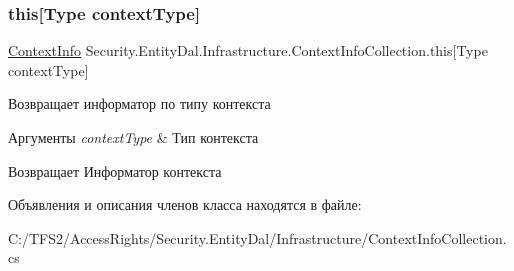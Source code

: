\subsubsection{\texorpdfstring{this[Type context\+Type]}{this[Type contextType]}}
{\footnotesize\ttfamily \hyperlink{class_security_1_1_entity_dal_1_1_infrastructure_1_1_context_info}{Context\+Info} Security.\+Entity\+Dal.\+Infrastructure.\+Context\+Info\+Collection.\+this\mbox{[}Type context\+Type\mbox{]}\hspace{0.3cm}{\ttfamily [get]}}



Возвращает информатор по типу контекста 


\begin{DoxyParams}{Аргументы}
{\em context\+Type} & Тип контекста\\
\hline
\end{DoxyParams}
\begin{DoxyReturn}{Возвращает}
Информатор контекста
\end{DoxyReturn}


Объявления и описания членов класса находятся в файле\+:\begin{DoxyCompactItemize}
\item 
C\+:/\+T\+F\+S2/\+Access\+Rights/\+Security.\+Entity\+Dal/\+Infrastructure/Context\+Info\+Collection.\+cs\end{DoxyCompactItemize}
